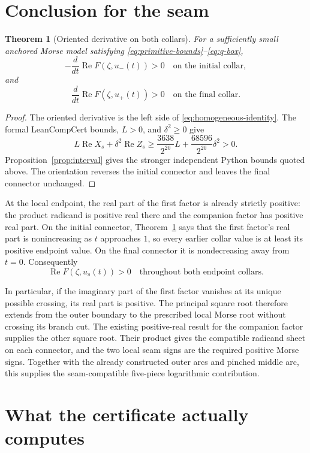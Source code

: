 \documentclass[11pt]{article}
\newtheorem{theorem}{Theorem}
\newcommand{\re}{\operatorname{Re}}
\begin{document}
\section{Conclusion for the seam}

\begin{theorem}[Oriented derivative on both collars]\label{thm:orientation}
For a sufficiently small anchored Morse model satisfying
\eqref{eq:primitive-bounds}--\eqref{eq:q-box},
\[
 -\frac{d}{dt}\re F(\zeta,u_-(t))>0
 \quad\text{on the initial collar},
\]
and
\[
 \frac{d}{dt}\re F(\zeta,u_+(t))>0
 \quad\text{on the final collar}.
\]
\end{theorem}

\begin{proof}
The oriented derivative is the left side of \eqref{eq:homogeneous-identity}.
The formal LeanCompCert bounds, \(L>0\), and \(\delta^2\geq0\) give
\[
 L\re X_s+\delta^2\re Z_s
 \geq\frac{3638}{2^{20}}L+\frac{68596}{2^{20}}\delta^2>0.
\]
Proposition~\ref{prop:interval} gives the stronger independent Python bounds quoted above.
The orientation reverses the initial connector and leaves the final connector unchanged.
\end{proof}

At the local endpoint, the real part of the first factor is already strictly positive:
the product radicand is positive real there and the companion factor has positive real part.
On the initial connector, Theorem~\ref{thm:orientation} says that the first factor's real part
is nonincreasing as \(t\) approaches \(1\), so every earlier collar value is at least its
positive endpoint value. On the final connector it is nondecreasing away from \(t=0\).
Consequently
\[
 \re F(\zeta,u_s(t))>0
 \quad\text{throughout both endpoint collars}.
\]

In particular, if the imaginary part of the first factor vanishes at its unique possible
crossing, its real part is positive. The principal square root therefore extends from the
outer boundary to the prescribed local Morse root without crossing its branch cut. The
existing positive-real result for the companion factor supplies the other square root.
Their product gives the compatible radicand sheet on each connector, and the two local seam
signs are the required positive Morse signs. Together with the already constructed outer arcs
and pinched middle arc, this supplies the seam-compatible five-piece logarithmic contribution.

\section{What the certificate actually computes}\label{sec:certificate-computation}
\end{document}

